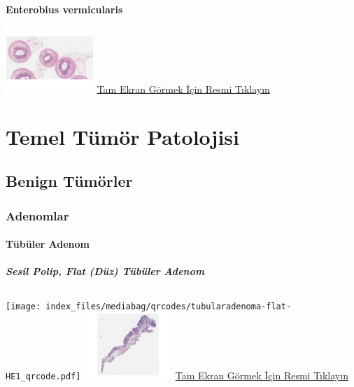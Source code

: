 \documentclass[
  letterpaper,
  DIV=11,
  numbers=noendperiod]{scrreprt}
\begin{document}
\textbf{Enterobius vermicularis}

\href{https://images.patolojiatlasi.com/enterobius-vermicularis/HE.html}{\includegraphics[width=0.25\textwidth,height=\textheight]{./screenshots/thumbnail_enterobius-vermicularis.png}}
\href{https://images.patolojiatlasi.com/enterobius-vermicularis/HE.html}{Tam
Ekran Görmek İçin Resmi Tıklayın}

\part{Temel Tümör Patolojisi}

\hypertarget{sec-benign-tumorler}{%
\chapter{Benign Tümörler}\label{sec-benign-tumorler}}

\hypertarget{sec-adenomlar}{%
\section{Adenomlar}\label{sec-adenomlar}}

\hypertarget{sec-tubuler-adenom}{%
\subsection{Tübüler Adenom}\label{sec-tubuler-adenom}}

\hypertarget{sec-sesil-polip}{%
\subsubsection{Sesil Polip, Flat (Düz) Tübüler
Adenom}\label{sec-sesil-polip}}

\hypertarget{section-8}{%
\chapter{}\label{section-8}}

\texttt{[image: index\_files/mediabag/qrcodes/tubularadenoma-flat-HE1\_qrcode.pdf]}
\href{https://images.patolojiatlasi.com/tubularadenoma-flat/HE.html}{\includegraphics[width=0.25\textwidth,height=\textheight]{./screenshots/thumbnail_tubularadenoma-flat1.png}}
\href{https://images.patolojiatlasi.com/tubularadenoma-flat/HE.html}{Tam
Ekran Görmek İçin Resmi Tıklayın}
\end{document}

